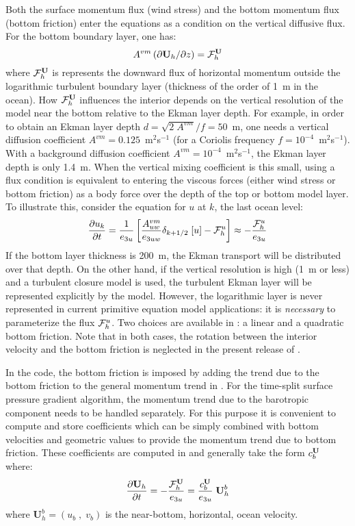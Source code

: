 \documentclass[../main/NEMO_manual]{subfiles}
\begin{document}
Both the surface momentum flux (wind stress) and the bottom momentum flux (bottom friction) enter the equations as
a condition on the vertical diffusive flux.
For the bottom boundary layer, one has:
\[
  A^{vm} \left( \partial {\textbf U}_h / \partial z \right) = {{\cal F}}_h^{\textbf U}
\]
where ${\cal F}_h^{\textbf U}$ is represents the downward flux of horizontal momentum outside
the logarithmic turbulent boundary layer (thickness of the order of 1~m in the ocean).
How ${\cal F}_h^{\textbf U}$ influences the interior depends on the vertical resolution of the model near
the bottom relative to the Ekman layer depth.
For example, in order to obtain an Ekman layer depth $d = \sqrt{2\;A^{vm}} / f = 50$~m,
one needs a vertical diffusion coefficient $A^{vm} = 0.125$~m$^2$s$^{-1}$
(for a Coriolis frequency $f = 10^{-4}$~m$^2$s$^{-1}$).
With a background diffusion coefficient $A^{vm} = 10^{-4}$~m$^2$s$^{-1}$, the Ekman layer depth is only 1.4~m. 
When the vertical mixing coefficient is this small, using a flux condition is equivalent to
entering the viscous forces (either wind stress or bottom friction) as a body force over the depth of the top or
bottom model layer.
To illustrate this, consider the equation for $u$ at $k$, the last ocean level:
\begin{equation}
  \label{eq:zdfbfr_flux2}
  \frac{\partial u_k}{\partial t} = \frac{1}{e_{3u}} \left[ \frac{A_{uw}^{vm}}{e_{3uw}} \delta_{k+1/2}\;[u] - {\cal F}^u_h \right] \approx - \frac{{\cal F}^u_{h}}{e_{3u}}
\end{equation}
If the bottom layer thickness is 200~m, the Ekman transport will be distributed over that depth.
On the other hand, if the vertical resolution is high (1~m or less) and a turbulent closure model is used,
the turbulent Ekman layer will be represented explicitly by the model.
However, the logarithmic layer is never represented in current primitive equation model applications:
it is \emph{necessary} to parameterize the flux ${\cal F}^u_h $.
Two choices are available in \NEMO: a linear and a quadratic bottom friction.
Note that in both cases, the rotation between the interior velocity and the bottom friction is neglected in
the present release of \NEMO.

In the code, the bottom friction is imposed by adding the trend due to the bottom friction to
the general momentum trend in .
For the time-split surface pressure gradient algorithm, the momentum trend due to
the barotropic component needs to be handled separately.
For this purpose it is convenient to compute and store coefficients which can be simply combined with
bottom velocities and geometric values to provide the momentum trend due to bottom friction.
These coefficients are computed in  and generally take the form $c_b^{\textbf U}$ where:
\begin{equation}
  \label{eq:zdfbfr_bdef}
  \frac{\partial {\textbf U_h}}{\partial t} =
  - \frac{{\cal F}^{\textbf U}_{h}}{e_{3u}} = \frac{c_b^{\textbf U}}{e_{3u}} \;{\textbf U}_h^b
\end{equation}
where $\textbf{U}_h^b = (u_b\;,\;v_b)$ is the near-bottom, horizontal, ocean velocity.
\end{document}
